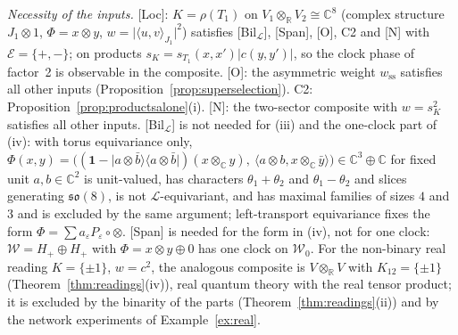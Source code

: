 \documentclass[aps,pra,onecolumn,superscriptaddress,nofootinbib,10pt]{revtex4-2}
\theoremstyle{definition}
\theoremstyle{remark}
\newcommand{\R}{\mathbb{R}}
\newcommand{\C}{\mathbb{C}}
\newcommand{\cL}{\mathcal{L}}
\newcommand{\ip}[2]{\langle #1,#2\rangle}
\begin{document}
\emph{Necessity of the inputs.}  [Loc]: $K=\rho(T_1)$ on $V_1\otimes_\R V_2\cong\C^8$ (complex structure $J_1\otimes1$, $\Phi=x\otimes y$,
$w=\lvert\ip uv_{J_1}\rvert^2$) satisfies [Bil$_\cL$], [Span], [O], C2 and [N] with $\mathcal E=\{+,-\}$; on products
$s_K=s_{T_1}(x,x')\lvert c(y,y')\rvert$, so the clock phase of factor~2 is observable in the composite.  [O]: the
asymmetric weight $w_{\mathrm{ss}}$ satisfies all other inputs (Proposition~\ref{prop:superselection}).  C2: Proposition~\ref{prop:productsalone}(i).  [N]: the two-sector composite
with $w=s_K^2$ satisfies all other inputs.  [Bil$_\cL$] is not needed for (iii) and the one-clock part of
(iv): with torus equivariance only, $\Phi(x,y)=\bigl((\mathbf1-\lvert a\otimes\bar b\rangle\langle a\otimes\bar b\rvert)(x\otimes_\C y),\ \ip{a\otimes b}{x\otimes_\C\bar y}\bigr)\in\C^3\oplus\C$ for
fixed unit $a,b\in\C^2$ is unit-valued, has characters $\theta_1+\theta_2$ and $\theta_1-\theta_2$ and slices generating
$\mathfrak{so}(8)$, is not $\cL$-equivariant, and has maximal families of sizes $4$ and $3$ and is excluded by the same
argument; left-transport equivariance fixes the form $\Phi=\sum a_\varepsilon P_\varepsilon\circ\otimes$.  [Span] is needed for the form in (iv),
not for one clock: $\mathcal W=H_+\oplus H_+$ with $\Phi=x\otimes y\oplus0$ has one clock on $\mathcal W_0$.  For the non-binary real
reading $K=\{\pm1\}$, $w=c^2$, the analogous composite is $V\otimes_\R V$ with $K_{12}=\{\pm1\}$
(Theorem~\ref{thm:readings}(iv)), real quantum theory with the real tensor product; it is excluded by the
binarity of the parts (Theorem~\ref{thm:readings}(ii)) and by the network experiments of
Example~\ref{ex:real}.
\end{document}
